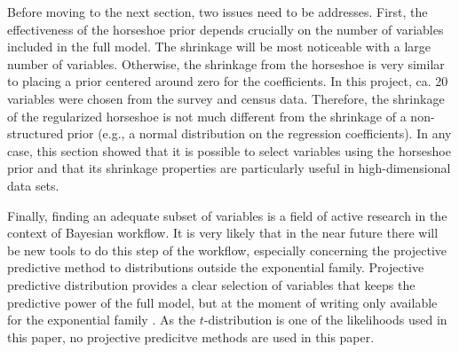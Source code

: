 Before moving to the next section, two issues need to be addresses.
First, the effectiveness of the horseshoe prior depends crucially on the number of variables included in the full model.
The shrinkage will be most noticeable with a large number of variables.
Otherwise, the shrinkage from the horseshoe is very similar to placing a prior centered around zero for the coefficients.
In this project, ca. 20 variables were chosen from the survey and census data.
Therefore, the shrinkage of the regularized horseshoe is not much different from the shrinkage of a non-structured prior (e.g., a normal distribution on the regression coefficients).
In any case, this section showed that it is possible to select variables using the horseshoe prior and that its shrinkage properties are particularly useful in high-dimensional data sets.

Finally, finding an adequate subset of variables is a field of active research in the context of Bayesian workflow.
It is very likely that in the near future there will be new tools to do this step of the workflow, especially concerning the projective predictive method to distributions outside the exponential family.
Projective predictive distribution provides a clear selection of variables that keeps the predictive power of the full model, but at the moment of writing only available for the exponential family \citep{piironen_sparsity_2017}.
As the $t$-distribution is one of the likelihoods used in this paper, no projective predicitve methods are used in this paper.
